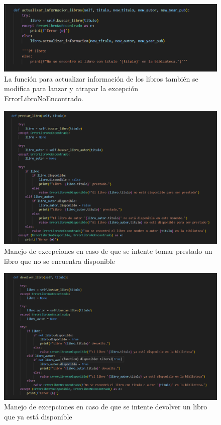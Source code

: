 \documentclass[11pt,a4paper]{article}
\begin{document}
\begin{figure}[h]
    \centering
    \includegraphics[width=1\linewidth]{images/8-3.png}
    \caption{La función para actualizar información de los libros también se modifica para lanzar y atrapar la excepción ErrorLibroNoEncontrado.}
    \label{fig:enter-label}
\end{figure}


\begin{figure}[H]
    \centering
    \includegraphics[width=1\linewidth]{images/8-4.png}
    \caption{Manejo de excepciones en caso de que se intente tomar prestado un libro que no se encuentra disponible}
    \label{fig:enter-label}
\end{figure}


\begin{figure}[H]
    \centering
    \includegraphics[width=1\linewidth]{images/8-5.png}
    \caption{Manejo de excepciones en caso de que se intente devolver un libro que ya está disponible}
    \label{fig:enter-label}
\end{figure}
\end{document}

